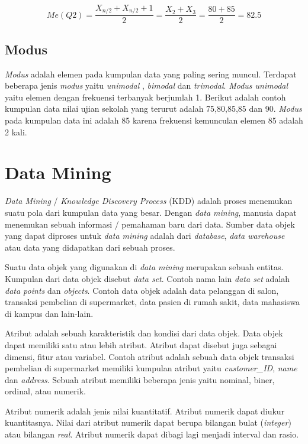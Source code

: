 \begin{displaymath}
Me(Q2) = \frac{X_{n/2} + X_{n/2}+1}{2} = \frac{X_{2} + X_{3}}{2} = \frac{80+85}{2} = 82.5
\end{displaymath}

\subsection{Modus}
\textit{Modus} adalah elemen pada kumpulan data yang paling sering muncul. Terdapat beberapa jenis \textit{modus} yaitu \textit{unimodal} , \textit{bimodal} dan \textit{trimodal}.  \textit{Modus unimodal} yaitu elemen dengan frekuensi terbanyak berjumlah 1. Berikut adalah contoh kumpulan data nilai ujian sekolah yang terurut adalah 75,80,85,85 dan 90. \textit{Modus} pada kumpulan data ini adalah 85 karena frekuensi kemunculan elemen 85 adalah 2 kali.  
 
 
\section{Data Mining  \cite{han2012mining}}
\textit{Data Mining} / \textit{Knowledge Discovery Process} (KDD) adalah proses menemukan suatu pola dari kumpulan data yang besar. Dengan \textit{data mining}, manusia dapat menemukan sebuah 
informasi / pemahaman baru dari data. Sumber data objek yang dapat diproses untuk \textit{data mining} adalah dari \textit{database}, \textit{data warehouse} atau data yang didapatkan dari sebuah proses.

Suatu data objek yang digunakan di \textit{data mining} merupakan sebuah entitas. Kumpulan dari data objek disebut \textit{data set}. Contoh nama lain \textit{data set} adalah \textit{data points} dan \textit{objects}. Contoh data objek adalah data pelanggan di salon, transaksi pembelian di supermarket, data pasien di rumah sakit, data mahasiswa di kampus dan lain-lain.

Atribut adalah sebuah karakteristik dan kondisi dari data objek. Data objek dapat memiliki satu atau lebih atribut.  Atribut dapat disebut juga sebagai dimensi, fitur atau variabel. Contoh atribut adalah
sebuah data objek transaksi pembelian di supermarket memiliki kumpulan atribut yaitu \textit{customer\_ID}, \textit{name} dan \textit{address}. Sebuah atribut memiliki beberapa jenis yaitu nominal, biner, ordinal, atau numerik. 

Atribut numerik adalah jenis nilai kuantitatif. Atribut numerik dapat diukur kuantitasnya. Nilai dari atribut numerik dapat berupa bilangan bulat (\textit{integer}) atau bilangan \textit{real}. Atribut numerik dapat dibagi lagi menjadi interval dan rasio.   

